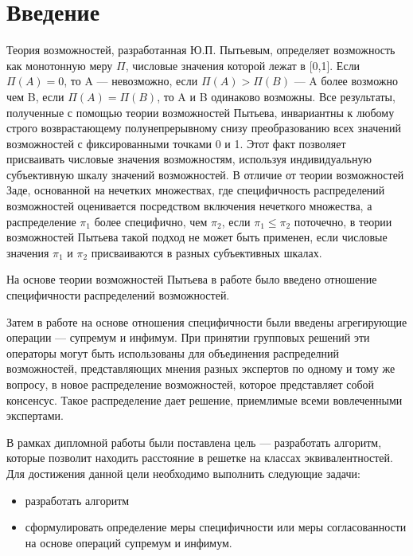 \documentclass[a4paper, 14pt]{extarticle}
\begin{document}
\newpage
\setcounter{page}{2}

\tableofcontents

\newpage
\setcounter{page}{3}
\pagestyle{plain}
\section*{Введение}
Теория возможностей, разработанная Ю.П. Пытьевым, определяет возможность как монотонную меру $\Pi$, числовые значения которой лежат в [0,1]. Если $\Pi(A) = 0$, то A --- невозможно, если $\Pi(A) > \Pi(B)$ --- A более возможно чем B, если $\Pi(A) = \Pi(B)$, то A и B одинаково возможны. Все результаты, полученные с помощью теории возможностей Пытьева, инвариантны к любому строго возврастающему полунепрерывному снизу преобразованию всех значений возможностей с фиксированными точками 0 и 1. Этот факт позволяет присваивать числовые значения возможностям, используя индивидуальную субъективную шкалу значений возможностей. В отличие от теории возможностей Заде, основанной на нечетких множествах, где специфичность распределений возможностей оценивается посредством включения нечеткого множества, а распределение $\pi_1$ более специфично, чем $\pi_2$, если $\pi_1 \leqslant \pi_2$ поточечно, в теории возможностей Пытьева такой подход не может быть применен, если числовые значения $\pi_1$ и $\pi_2$ присваиваются в разных субъективных шкалах. 

На основе теории возможностей Пытьева в работе \cite{zubyuk-fss-2018} было введено отношение специфичности распределений возможностей. 

Затем в работе \cite{ag-op-2021} на основе отношения специфичности были введены агрегирующие операции --- супремум и инфимум. При принятии групповых решений эти операторы могут быть использованы для объединения распределний возможностей, представляющих мнения разных экспертов по одному и тому же вопросу, в новое распределение возможностей, которое представляет собой консенсус. Такое распределение дает решение, приемлимые всеми вовлеченными экспертами.

В рамках дипломной работы были поставлена цель --- разработать алгоритм, которые позволит находить расстояние в решетке на классах эквивалентностей. Для достижения данной цели необходимо выполнить следующие задачи:
\begin{itemize}
    \item разработать алгоритм 
    \item сформулировать определение меры специфичности или меры согласованности на основе операций супремум и инфимум.
\end{itemize}
\end{document}
